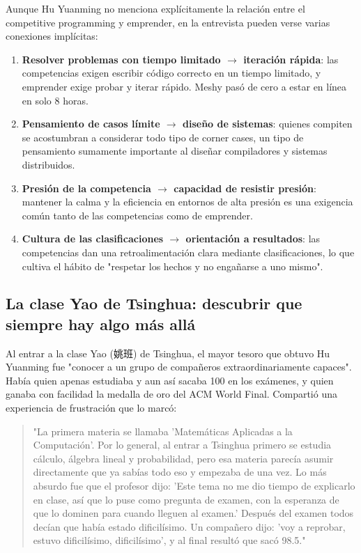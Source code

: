 Aunque Hu Yuanming no menciona explícitamente la relación entre el competitive programming y emprender, en la entrevista pueden verse varias conexiones implícitas:

\begin{enumerate}
\item \textbf{Resolver problemas con tiempo limitado $\rightarrow$ iteración rápida}: las competencias exigen escribir código correcto en un tiempo limitado, y emprender exige probar y iterar rápido. Meshy pasó de cero a estar en línea en solo 8 horas.
\item \textbf{Pensamiento de casos límite $\rightarrow$ diseño de sistemas}: quienes compiten se acostumbran a considerar todo tipo de corner cases, un tipo de pensamiento sumamente importante al diseñar compiladores y sistemas distribuidos.
\item \textbf{Presión de la competencia $\rightarrow$ capacidad de resistir presión}: mantener la calma y la eficiencia en entornos de alta presión es una exigencia común tanto de las competencias como de emprender.
\item \textbf{Cultura de las clasificaciones $\rightarrow$ orientación a resultados}: las competencias dan una retroalimentación clara mediante clasificaciones, lo que cultiva el hábito de "respetar los hechos y no engañarse a uno mismo".
\end{enumerate}

\subsection{La clase Yao de Tsinghua: descubrir que siempre hay algo más allá}

Al entrar a la clase Yao (姚班) de Tsinghua, el mayor tesoro que obtuvo Hu Yuanming fue "conocer a un grupo de compañeros extraordinariamente capaces". Había quien apenas estudiaba y aun así sacaba 100 en los exámenes, y quien ganaba con facilidad la medalla de oro del ACM World Final. Compartió una experiencia de frustración que lo marcó:

\begin{quote}
"La primera materia se llamaba 'Matemáticas Aplicadas a la Computación'. Por lo general, al entrar a Tsinghua primero se estudia cálculo, álgebra lineal y probabilidad, pero esa materia parecía asumir directamente que ya sabías todo eso y empezaba de una vez. Lo más absurdo fue que el profesor dijo: 'Este tema no me dio tiempo de explicarlo en clase, así que lo puse como pregunta de examen, con la esperanza de que lo dominen para cuando lleguen al examen.' Después del examen todos decían que había estado dificilísimo. Un compañero dijo: 'voy a reprobar, estuvo dificilísimo, dificilísimo', y al final resultó que sacó 98.5."
\end{quote}

